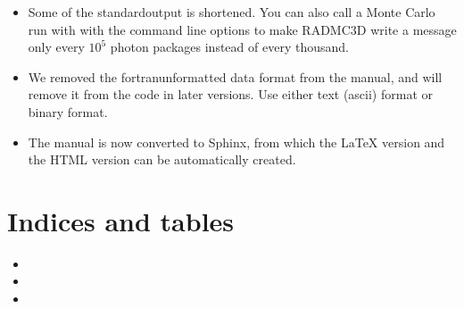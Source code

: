 \documentclass[letterpaper,10pt,english]{sphinxmanual}
\begin{document}
\begin{itemize}
\begin{itemize}
\item {} 
Some of the standard\sphinxhyphen{}output is shortened. You can also call a
Monte Carlo run with  with the command line
options  to make RADMC\sphinxhyphen{}3D write a
message only every \(10^5\) photon packages instead of every thousand.

\item {} 
We removed the fortran\sphinxhyphen{}unformatted data format from the manual,
and will remove it from the code in later versions. Use either text
(ascii) format or binary format.

\item {} 
The manual is now converted to Sphinx, from which the LaTeX version
and the HTML version can be automatically created.

\end{itemize}

\end{itemize}


\chapter{Indices and tables}
\label{\detokenize{index:indices-and-tables}}\begin{itemize}
\item {} 

\item {} 

\item {} 

\end{itemize}



\renewcommand{\indexname}{Index}
\printindex
\end{document}
